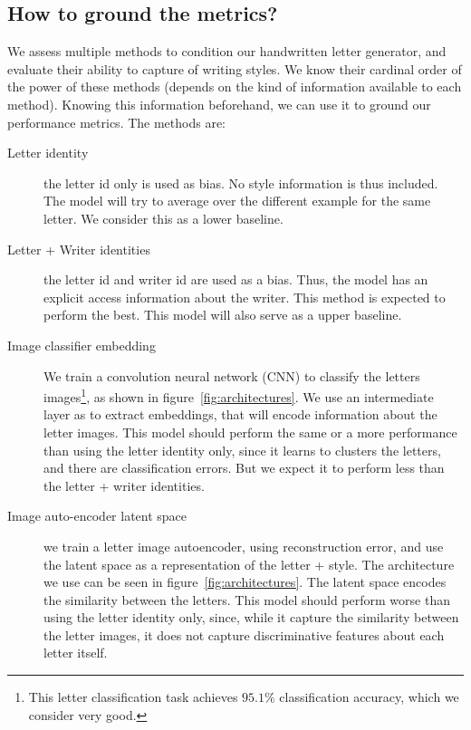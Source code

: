 \subsection{How to ground the metrics?}\label{subsec:ground_metrics}
\par We assess multiple methods to condition our handwritten letter generator, and evaluate their ability to capture of writing styles. We know their cardinal order of the power of these methods (depends on the kind of information available to each method). Knowing this information beforehand, we can use it to ground our performance metrics. The methods are:
\begin{description}
    \item[Letter identity] the letter id only is used as bias. No style information is thus included. The model will try to average over the different example for the same letter. We consider this as a lower baseline.
    \item[Letter + Writer identities] the letter id and writer id are used as a bias. Thus, the model has an explicit access information about the writer. This method is expected to perform the best. This model will also serve as a upper baseline.
    \item[Image classifier embedding] We train a convolution neural network (CNN) to classify the letters images\footnote{This letter classification task achieves $95.1\%$ classification accuracy, which we consider very good.}, as shown in figure~\ref{fig:architectures}. We use an intermediate layer as to extract embeddings, that will encode information about the letter images. This model should perform the same or a more performance than using the letter identity only, since it learns to clusters the letters, and there are classification errors. But we expect it to perform less than the letter + writer identities.
    \item[Image auto-encoder latent space] we train a letter image autoencoder, using reconstruction error, and use the latent space as a representation of the letter + style. The architecture we use can be seen in figure~\ref{fig:architectures}. The latent space encodes the similarity between the letters. This model should perform worse than using the letter identity only, since, while it capture the similarity between the letter images, it does not capture discriminative features about each letter itself.
\end{description}

